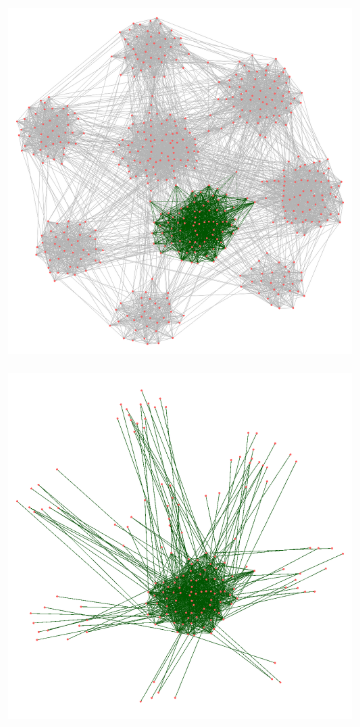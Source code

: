 \begin{figure}
\centering
	\begin{subfigure}{0.31\textwidth}
		\includegraphics[width=\linewidth]{img/ExpectedNodes/LF/Graphe_Complet_select.png}
		\caption{}		
	\end{subfigure}
	\begin{subfigure}{0.31\textwidth}
		\includegraphics[width=\linewidth]{img/ExpectedNodes/LF/E2_bis.png}

\end{subfigure}
\end{figure}
